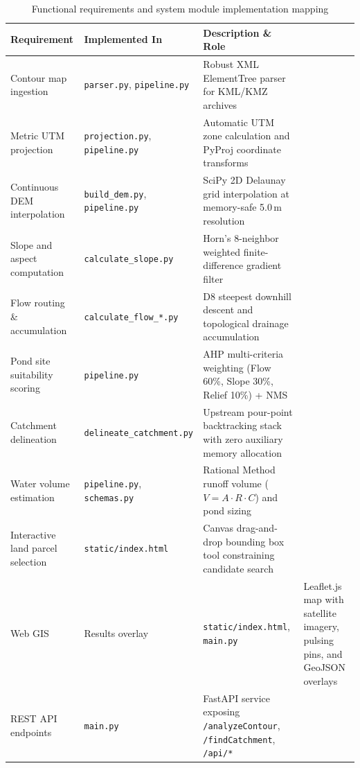 \documentclass[manuscript,screen,review]{acmart}
\begin{document}
\begin{table}[h]
  \caption{Functional requirements and system module implementation mapping}
  \label{tab:requirements}
  \small
  \begin{tabular}{p{4.2cm}p{3.2cm}p{6.4cm}}
    \toprule
    Requirement & Implemented In & Description \& Role \\
    \midrule
    Contour map ingestion & \texttt{parser.py}, \texttt{pipeline.py} & Robust XML ElementTree parser for KML/KMZ archives \\
    Metric UTM projection & \texttt{projection.py}, \texttt{pipeline.py} & Automatic UTM zone calculation and PyProj coordinate transforms \\
    Continuous DEM interpolation & \texttt{build\_dem.py}, \texttt{pipeline.py} & SciPy 2D Delaunay grid interpolation at memory-safe 5.0\,m resolution \\
    Slope and aspect computation & \texttt{calculate\_slope.py} & Horn's 8-neighbor weighted finite-difference gradient filter \\
    Flow routing \& accumulation & \texttt{calculate\_flow\_*.py} & D8 steepest downhill descent and topological drainage accumulation \\
    Pond site suitability scoring & \texttt{pipeline.py} & AHP multi-criteria weighting (Flow 60\%, Slope 30\%, Relief 10\%) + NMS \\
    Catchment delineation & \texttt{delineate\_catchment.py} & Upstream pour-point backtracking stack with zero auxiliary memory allocation \\
    Water volume estimation & \texttt{pipeline.py}, \texttt{schemas.py} & Rational Method runoff volume ($V = A \cdot R \cdot C$) and pond sizing \\
    Interactive land parcel selection & \texttt{static/index.html} & Canvas drag-and-drop bounding box tool constraining candidate search \\
    Web GIS & Results overlay & \texttt{static/index.html}, \texttt{main.py} & Leaflet.js map with satellite imagery, pulsing pins, and GeoJSON overlays \\
    REST API endpoints & \texttt{main.py} & FastAPI service exposing \texttt{/analyzeContour}, \texttt{/findCatchment}, \texttt{/api/*} \\
    \bottomrule
  \end{tabular}
\end{table}
\end{document}
